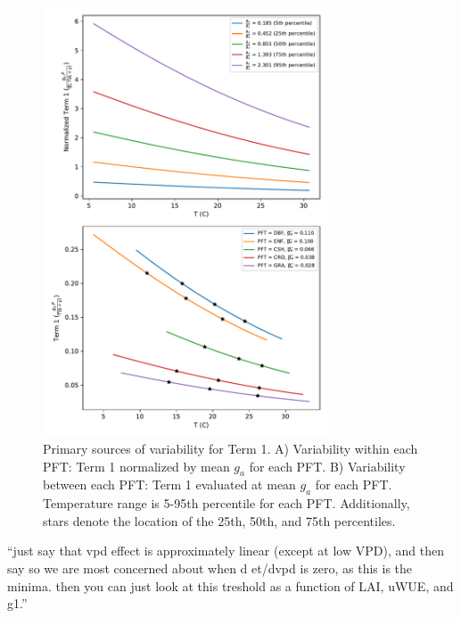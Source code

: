 \documentclass[draft,linenumbers]{agujournal}
\begin{document}
\begin{figure}[h]
\centering
\includegraphics[width=20pc]{./fig04.pdf}
\caption{Primary sources of variability for Term 1. A) Variability within each PFT: Term 1 normalized by mean $g_a$ for each PFT. B) Variability between each PFT: Term 1 evaluated at mean $g_a$ for each PFT. Temperature range is 5-95th percentile for each PFT. Additionally, stars denote the location of the 25th, 50th, and 75th percentiles.}
\label{scale_vary}
\end{figure}


``just say that vpd effect is approximately linear (except at low VPD), and then say so we are most concerned about when d et/dvpd is zero, as this is the minima. then you can just look at this treshold as a function of LAI, uWUE, and g1.''
\end{document}
